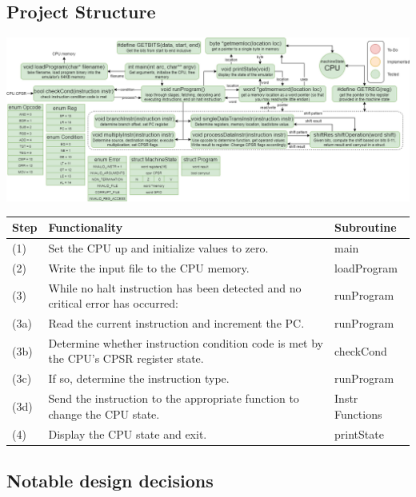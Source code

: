 \documentclass[11pt]{article}
\begin{document}
    \subsection*{Project Structure}
        \begin{center}
            \includegraphics[width = \textwidth]{project status}
        \end{center}
    \begin{center}
        \begin{tabular}{l l l}
            Step & Functionality & Subroutine \\
            \hline
            (1) & Set the CPU up and initialize values to zero. & \textcolor{OliveGreen}{main} \\
            (2) & Write the input file to the CPU memory. & \textcolor{OliveGreen}{loadProgram}\\
            (3) & While no halt instruction has been detected and no critical error has occurred: & \textcolor{OliveGreen}{runProgram} \\
            (3a) & Read the current instruction and increment the PC.  & \textcolor{OliveGreen}{runProgram}\\
            (3b) & Determine whether instruction condition code is met by the CPU's CPSR register state. & \textcolor{OliveGreen}{checkCond}\\
            (3c) & If so, determine the instruction type.  & \textcolor{OliveGreen}{runProgram}\\
            (3d) & Send the instruction to the appropriate function to change the CPU state. & \textcolor{OliveGreen}{Instr Functions}\\
            (4) & Display the CPU state and exit. & \textcolor{OliveGreen}{printState} \\
        \end{tabular}
    \end{center}

    \subsection*{Notable design decisions}
\end{document}
